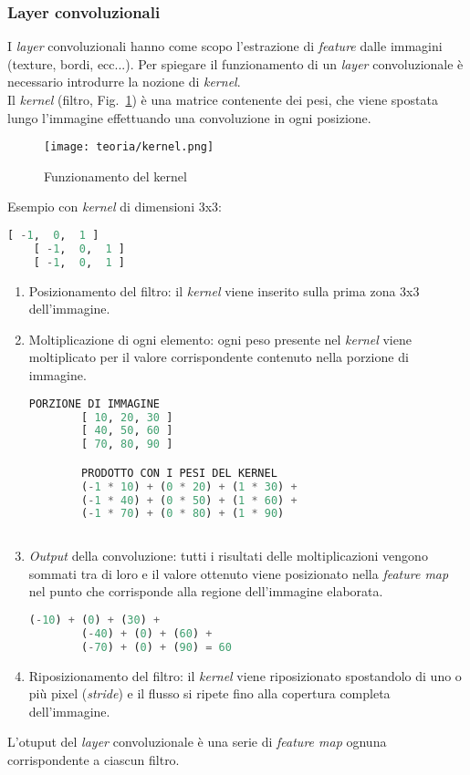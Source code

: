 \subsubsection{Layer convoluzionali}
I \emph{layer} convoluzionali hanno come scopo l'estrazione di \emph{\gls{feature}} dalle immagini (texture, bordi, ecc...).
Per spiegare il funzionamento di un \emph{layer} convoluzionale è necessario introdurre la nozione di \emph{kernel}.\\Il \emph{kernel} (filtro, Fig.~\ref{fig:kernel}) è una matrice contenente dei pesi, che viene spostata lungo l'immagine effettuando una convoluzione in ogni posizione.

\begin{figure}[!h] 
    \centering 
    \texttt{[image: teoria/kernel.png]} 
    \caption{Funzionamento del kernel}
    \label{fig:kernel}
  \end{figure}
Esempio con \emph{kernel} di dimensioni 3x3:

\begin{lstlisting}[language=Python, frame=none]
    [ -1,  0,  1 ]
    [ -1,  0,  1 ]
    [ -1,  0,  1 ]
\end{lstlisting}


\begin{enumerate}
    \item Posizionamento del filtro: il \emph{kernel} viene inserito sulla prima zona 3x3 dell'immagine.
    \item Moltiplicazione di ogni elemento: ogni peso presente nel \emph{kernel} viene moltiplicato per il valore corrispondente contenuto nella porzione di immagine.
    \newpage
    \begin{lstlisting}[language=Python, frame=none]
        PORZIONE DI IMMAGINE
        [ 10, 20, 30 ]
        [ 40, 50, 60 ]
        [ 70, 80, 90 ]

        PRODOTTO CON I PESI DEL KERNEL
        (-1 * 10) + (0 * 20) + (1 * 30) +
        (-1 * 40) + (0 * 50) + (1 * 60) +
        (-1 * 70) + (0 * 80) + (1 * 90)
            
    \end{lstlisting}
    \item \emph{Output} della convoluzione: tutti i risultati delle moltiplicazioni vengono sommati tra di loro e il valore ottenuto viene posizionato nella \emph{feature map} nel punto che corrisponde alla regione dell'immagine elaborata.
    \begin{lstlisting}[language=Python, frame=none]
        (-10) + (0) + (30) +
        (-40) + (0) + (60) +
        (-70) + (0) + (90) = 60
    \end{lstlisting}
    \item Riposizionamento del filtro: il \emph{kernel} viene riposizionato spostandolo di uno o più pixel (\emph{stride}) e il flusso si ripete fino alla copertura completa dell'immagine.
\end{enumerate}
L'otuput del \emph{layer} convoluzionale è una serie di \emph{feature map} ognuna corrispondente a ciascun filtro.


